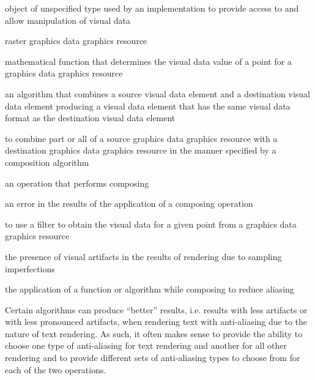 %
%
 object of unspecified type used by an implementation to provide access to and allow manipulation of visual data

\indexdefn{\pixmap}%
raster graphics data graphics resource

%
mathematical function that determines the visual data value of a point for a graphics data graphics resource

%
an algorithm that combines a source visual data element and a destination visual data element producing a visual data element that has the same visual data format as the destination visual data element

%
to combine part or all of a source graphics data graphics resource with a destination graphics data graphics resource in the manner specified by a composition algorithm

%
an operation that performs composing

%
an error in the results of the application of a composing operation 

%
to use a filter to obtain the visual data for a given point from a graphics data graphics resource

%
the presence of visual artifacts in the results of rendering due to 
sampling imperfections

%
the application of a function or algorithm while composing to 
reduce aliasing
\begin{note}
Certain algorithms can produce ``better'' results, i.e. results with less artifacts or with less pronounced artifacts, when rendering text with anti-aliasing due to the nature of text rendering. As such, it often makes sense to provide the ability to choose one type of anti-aliasing for text rendering and another for all other rendering and to provide different sets of anti-aliasing types to choose from for each of the two operations.
\end{note}

